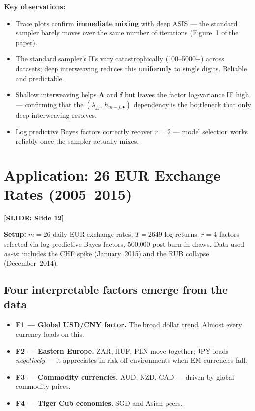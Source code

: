 \documentclass[11pt, a4paper]{article}\usepackage[]{graphicx}\usepackage[]{xcolor}
\newcommand{\slidetag}[1]{%
  \noindent\textcolor{MainBlue}{\footnotesize\textbf{[SLIDE: #1]}}%
  \vspace{0.2em}\par
}
\newcommand{\stress}[1]{\textbf{#1}}
\begin{document}
\textbf{Key observations:}
\begin{itemize}[itemsep=3pt]
  \item Trace plots confirm \stress{immediate mixing} with deep ASIS --- the
        standard sampler barely moves over the same number of iterations
        (Figure~1 of the paper).
  \item The standard sampler's IFs vary catastrophically (100--5000+) across
        datasets; deep interweaving reduces this \stress{uniformly} to
        single digits.  Reliable and predictable.
  \item Shallow interweaving helps $\boldsymbol{\Lambda}$ and $\mathbf{f}$
        but leaves the factor log-variance IF high --- confirming that the
        $({\lambda_{jj}},\, {h_{m+j,\bullet}})$ dependency is the bottleneck
        that only deep interweaving resolves.
  \item Log predictive Bayes factors correctly recover $r = 2$ --- model
        selection works reliably once the sampler actually mixes.
\end{itemize}

\section{Application: 26 EUR Exchange Rates (2005--2015)}

\slidetag{Slide 12}

\textbf{Setup:} $m = 26$ daily EUR exchange rates, $T = 2649$ log-returns,
$r = 4$ factors selected via log predictive Bayes factors, 500{,}000
post-burn-in draws.  Data used \textit{as-is}: includes the CHF spike
(January~2015) and the RUB collapse (December~2014).

\subsection{Four interpretable factors emerge from the data}

\begin{itemize}[itemsep=4pt]
  \item \textbf{F1 --- Global USD/CNY factor.}
        The broad dollar trend.  Almost every currency loads on this.
  \item \textbf{F2 --- Eastern Europe.}
        ZAR, HUF, PLN move together; JPY loads \textit{negatively} ---
        it appreciates in risk-off environments when EM currencies fall.
  \item \textbf{F3 --- Commodity currencies.}
        AUD, NZD, CAD --- driven by global commodity prices.
  \item \textbf{F4 --- Tiger Cub economies.}
        SGD and Asian peers.
\end{itemize}
\end{document}
